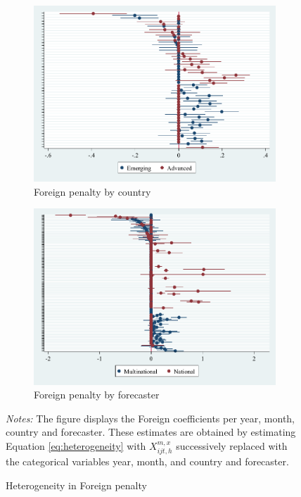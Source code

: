 \documentclass[letterpaper,12pt]{article}
\newenvironment{fignote}{\footnotesize \begin{singlespace} \noindent}{\end{singlespace} \par }
\begin{document}
\begin{landscape}
\begin{figure}[H]
\begin{subfigure}[b]{0.65\textwidth}
		\includegraphics[width=1\linewidth]{../output/figures/heterogeneity_by_cty.pdf}
		\caption{Foreign penalty by country}
	\end{subfigure}
	\hfill
	\begin{subfigure}[b]{0.65\textwidth}
		\centering
		\includegraphics[width=1\linewidth]{../output/figures/heterogeneity_by_for.pdf}
		\caption{Foreign penalty by forecaster}
	\end{subfigure}
		\caption{Heterogeneity in Foreign penalty}
	\begin{fignote}
		\textit{Notes:} The figure displays the Foreign coefficients per year, month, country and forecaster. These estimates are obtained by estimating Equation \eqref{eq:heterogeneity} with $X_{ijt,h}^{m,x}$ successively replaced with the categorical variables year, month, and country and forecaster.
	\end{fignote}
	\label{fig:heterogeneity}
\end{figure}
\end{landscape}
\end{document}
